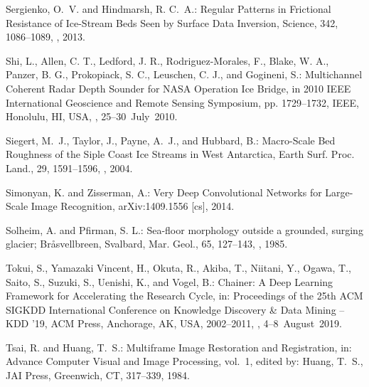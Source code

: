 \documentclass[tc, noline]{copernicus}
\begin{document}
\begin{thebibliography}{95}
Sergienko, O.~V. and Hindmarsh, R. C.~A.:
Regular Patterns in Frictional Resistance of Ice-Stream Beds Seen by Surface Data Inversion,
Science,
342, 1086--1089, , 2013.

Shi, L., Allen, C. T., Ledford, J. R., Rodriguez-Morales, F., Blake, W. A., Panzer, B. G., Prokopiack, S. C., Leuschen, C. J., and Gogineni, S.: Multichannel Coherent Radar Depth Sounder for NASA Operation Ice Bridge, in 2010 IEEE International Geoscience and Remote Sensing Symposium, pp. 1729--1732, IEEE, Honolulu, HI, USA, , 25--30~July~2010.

Siegert, M.~J., Taylor, J., Payne, A.~J., and Hubbard, B.:
Macro-Scale Bed Roughness of the Siple Coast Ice Streams in West Antarctica,
Earth Surf. Proc. Land.,
29, 1591--1596, , 2004.

Simonyan, K. and Zisserman, A.:
Very Deep Convolutional Networks for Large-Scale Image Recognition,
arXiv:1409.1556 [cs], 2014.

Solheim, A. and Pfirman, S. L.: Sea-floor morphology outside a grounded, surging glacier; Br{\aa}svellbreen, Svalbard, Mar. Geol., 65, 127--143, , 1985.


Tokui, S., Yamazaki Vincent, H., Okuta, R., Akiba, T., Niitani, Y., Ogawa, T., Saito, S., Suzuki, S., Uenishi, K., and Vogel, B.: Chainer: A Deep Learning Framework for Accelerating the Research Cycle, in: Proceedings of the 25th ACM SIGKDD International Conference on Knowledge Discovery \& Data Mining  -- KDD '19, ACM Press, Anchorage, AK, USA, 2002--2011, , 4--8~August~2019.

Tsai, R. and Huang, T.~S.:
Multiframe Image Restoration and Registration,
in: Advance Computer Visual and Image Processing, vol.~1,
edited by: Huang, T.~S.,
JAI Press, Greenwich, CT, 317--339, 1984.



\end{thebibliography}
\end{document}
